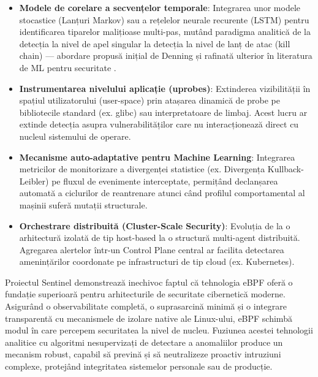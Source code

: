 \begin{itemize}
    \item \textbf{Modele de corelare a secvențelor temporale}: Integrarea unor modele stocastice (Lanțuri Markov) sau a rețelelor neurale recurente (LSTM) pentru identificarea tiparelor malițioase multi-pas, mutând paradigma analitică de la detecția la nivel de apel singular la detecția la nivel de lanț de atac (kill chain) --- abordare propusă inițial de Denning \cite{Denning1987} și rafinată ulterior în literatura de ML pentru securitate \cite{Buczak2016}.
    \item \textbf{Instrumentarea nivelului aplicație (uprobes)}: Extinderea vizibilității în spațiul utilizatorului (user-space) prin atașarea dinamică de probe pe bibliotecile standard (ex. glibc) sau interpretatoare de limbaj. Acest lucru ar extinde detecția asupra vulnerabilităților care nu interacționează direct cu nucleul sistemului de operare.
    \item \textbf{Mecanisme auto-adaptative pentru Machine Learning}: Integrarea metricilor de monitorizare a divergenței statistice (ex. Divergența Kullback-Leibler) pe fluxul de evenimente interceptate, permițând declanșarea automată a ciclurilor de reantrenare atunci când profilul comportamental al mașinii suferă mutații structurale.
    \item \textbf{Orchestrare distribuită (Cluster-Scale Security)}: Evoluția de la o arhitectură izolată de tip host-based la o structură multi-agent distribuită. Agregarea alertelor într-un Control Plane central ar facilita detectarea amenințărilor coordonate pe infrastructuri de tip cloud (ex. Kubernetes).
\end{itemize}

\par Proiectul Sentinel demonstrează inechivoc faptul că tehnologia eBPF oferă o fundație superioară pentru arhitecturile de securitate cibernetică moderne. Asigurând o observabilitate completă, o suprasarcină minimă și o integrare transparentă cu mecanismele de izolare native ale Linux-ului, eBPF schimbă modul în care percepem securitatea la nivel de nucleu. Fuziunea acestei tehnologii analitice cu algoritmi nesupervizați de detectare a anomaliilor produce un mecanism robust, capabil să prevină și să neutralizeze proactiv intruziuni complexe, protejând integritatea sistemelor personale sau de producție.
